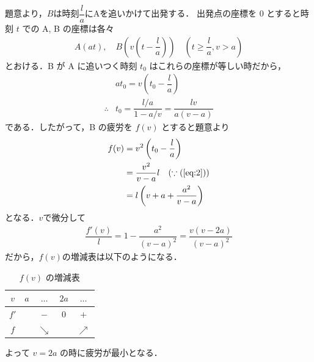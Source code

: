 \documentclass[../../main.tex]{subfiles}
\begin{document}
題意より，$B$は時刻$\dfrac{l}{a}$にAを追いかけて出発する．
出発点の座標を $0$ とすると時刻 $t$ での A, B の座標は各々
\begin{align}
  A(at), \quad
  B\left(v\left(t - \dfrac{l}{a}\right)\right) \quad
  \left(t \ge \dfrac{l}{a}, v > a\right) \label{eq:1}
\end{align}
とおける．B が A に追いつく時刻 $t_0$ はこれらの座標が等しい時だから，
\begin{align}
  & at_0 = v\left(t_0 - \dfrac{l}{a}\right) \\
  \therefore
  & t_0 = \dfrac{l/a}{1 - a/v} = \dfrac{lv}{a(v-a)} \label{eq:2}
\end{align}
である．したがって，B の疲労を $f(v)$ とすると題意より
\begin{align}
  f(v) &= v^2 \left(t_0 - \dfrac{l}{a}\right) \\
  &= \dfrac{v^2}{v-a} l \quad (\because(\text{\cref{eq:2}}))\\
  &= l \left(v + a + \dfrac{a^2}{v-a}\right) \label{eq:3}
\end{align}
となる．$v$で微分して
\begin{align}
  \dfrac{f'(v)}{l} = 1 - \dfrac{a^2}{(v-a)^2} = \dfrac{v(v-2a)}{(v-a)^2}
\end{align}
だから，$f(v)$の増減表は以下のようになる．

\begin{table}[htb]
  \centering
  \caption{$f(v)$ の増減表}
  \label{tab:1961_4_fv_variation}
  \renewcommand{\arraystretch}{1.4}
  \begin{tabular}{c|cccc}
    \hline
    $v$ & $a$ & $\dots$ & $2a$ & $\dots$ \\ \hline
    $f'$ & & $-$ & $0$ & $+$ \\ \hline
    $f$ & & $\searrow$ & & $\nearrow$ \\ \hline
  \end{tabular}
\end{table}

よって $v = 2a$ の時に疲労が最小となる．

\newpage
\end{document}
